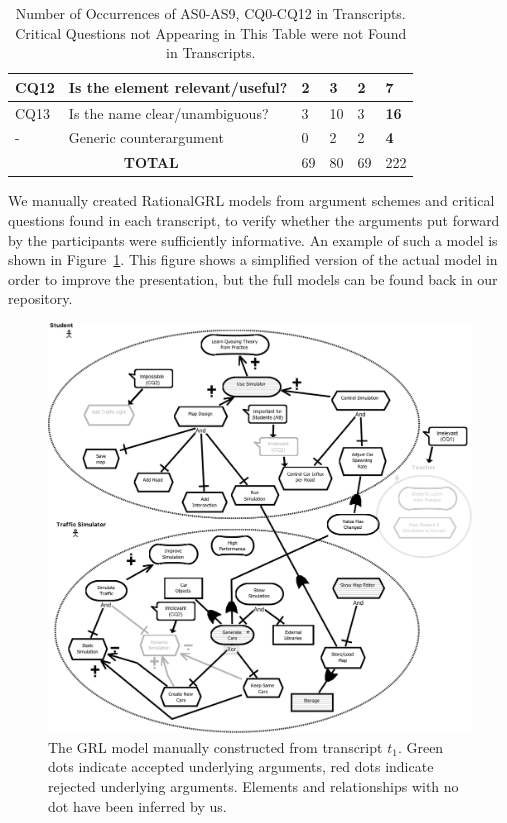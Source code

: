 \begin{table}[ht]
\begin{tabularx}{0.5\textwidth}{|l|X|l|l|l|>{\bfseries}l|}
\hline
\hline
CQ12 & Is the element relevant/useful? & 2 & 3 & 2 &7\\
\hline
CQ13 & Is the name clear/unambiguous? &3 &10 & 3 & 16\\
\hline
\hline
- & Generic counterargument & 0& 2 & 2 & 4\\
\hline
\hline
\multicolumn{2}{|c|}{\textbf{TOTAL}}&69&80&69&222\\
\hline
\end{tabularx}
\caption{Number of Occurrences of AS0-AS9, CQ0-CQ12 in Transcripts. Critical Questions not Appearing in This Table were not Found in Transcripts.}
\label{table:transcripts:results:argumentschemes}
\end{table}

We manually created RationalGRL models from argument schemes and critical questions found in each transcript, to verify whether the arguments put forward by the participants were sufficiently informative. An example of such a model is shown in Figure~\ref{fig:transcripts:grl}. This figure shows a simplified version of the actual model in order to improve the presentation, but the full models can be found back in our repository. 

\begin{figure}[h!]
\includegraphics[width=\textwidth]{img/Fig6}
\caption{The GRL model manually constructed from transcript $t_1$. Green dots indicate accepted underlying arguments, red dots indicate rejected underlying arguments. Elements and relationships with no dot have been inferred by us.} %
\label{fig:transcripts:grl}
\end{figure} 

